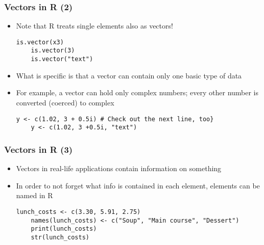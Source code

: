 \documentclass[10pt]{beamer}
\theoremstyle{definition}
\begin{document}
\begin{frame}[fragile]
\frametitle{Vectors in R (2)}
\begin{itemize}
	\item Note that R treats single elements also as vectors!
	\begin{lstlisting}[style = rstyle, breaklines]
	is.vector(x3)
	is.vector(3)
	is.vector("text")
	\end{lstlisting}
	
	\item What is specific is that a vector can contain only one basic type of data
	
	\item For example, a vector can hold only complex numbers; every other number is converted (coerced) to complex
	\begin{lstlisting}[style = rstyle, breaklines]
	y <- c(1.02, 3 + 0.5i) # Check out the next line, too}
	y <- c(1.02, 3 +0.5i, "text")
	\end{lstlisting}
\end{itemize}
\end{frame}

\begin{frame}[fragile]
\frametitle{Vectors in R (3)}
\begin{itemize}
	\item Vectors in real-life applications contain information on something
	
	\item In order to not forget what info is contained in each element, elements can be named in R
	\begin{lstlisting}[style = rstyle, breaklines]
	lunch_costs <- c(3.30, 5.91, 2.75)
	names(lunch_costs) <- c("Soup", "Main course", "Dessert")
	print(lunch_costs)
	str(lunch_costs)
	\end{lstlisting}
\end{itemize}
\end{frame}
\end{document}
